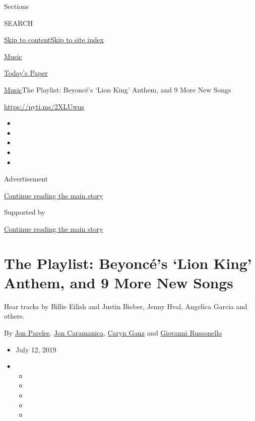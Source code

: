 Sections

SEARCH

\protect\hyperlink{site-content}{Skip to
content}\protect\hyperlink{site-index}{Skip to site index}

\href{https://www.nytimes.com/section/arts/music}{Music}

\href{https://myaccount.nytimes.com/auth/login?response_type=cookie\&client_id=vi}{}

\href{https://www.nytimes.com/section/todayspaper}{Today's Paper}

\href{/section/arts/music}{Music}\textbar{}The Playlist: Beyoncé's `Lion
King' Anthem, and 9 More New Songs

\url{https://nyti.ms/2XLUwus}

\begin{itemize}
\item
\item
\item
\item
\item
\end{itemize}

Advertisement

\protect\hyperlink{after-top}{Continue reading the main story}

Supported by

\protect\hyperlink{after-sponsor}{Continue reading the main story}

\hypertarget{the-playlist-beyoncuxe9s-lion-king-anthem-and-9-more-new-songs}{%
\section{The Playlist: Beyoncé's `Lion King' Anthem, and 9 More New
Songs}\label{the-playlist-beyoncuxe9s-lion-king-anthem-and-9-more-new-songs}}

Hear tracks by Billie Eilish and Justin Bieber, Jenny Hval, Angelica
Garcia and others.

By \href{https://www.nytimes.com/by/jon-pareles}{Jon Pareles},
\href{https://www.nytimes.com/by/jon-caramanica}{Jon Caramanica},
\href{https://www.nytimes.com/by/caryn-ganz}{Caryn Ganz} and
\href{https://www.nytimes.com/by/giovanni-russonello}{Giovanni
Russonello}

\begin{itemize}
\item
  July 12, 2019
\item
  \begin{itemize}
  \item
  \item
  \item
  \item
  \item
  \end{itemize}
\end{itemize}

